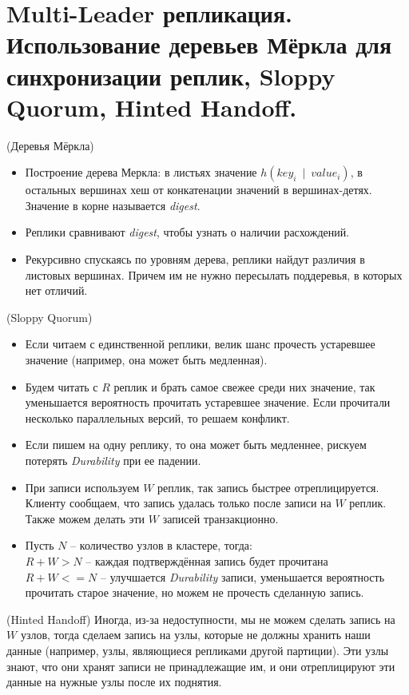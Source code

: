 \section{Multi-Leader репликация. Использование деревьев Мёркла для синхронизации реплик, Sloppy Quorum, Hinted Handoff.}

\begin{algorithm}(Деревья Мёркла)
\begin{itemize}
    \item Построение дерева Меркла: в листьях значение $h(key_i ~\mid~ value_i)$,
        в остальных вершинах хеш от конкатенации значений в вершинах-детях.
        Значение в корне называется \textit{digest}.
    \item Реплики сравнивают \textit{digest}, чтобы узнать о наличии расхождений.
    \item Рекурсивно спускаясь по уровням дерева, реплики найдут различия
        в листовых вершинах. Причем им не нужно пересылать поддеревья,
        в которых нет отличий.
\end{itemize}
\end{algorithm}

\begin{algorithm}(Sloppy Quorum)
  \begin{itemize}
    \item Если читаем с единственной реплики, велик шанс прочесть устаревшее значение
        (например, она может быть медленная).
    \item Будем читать с $R$ реплик и брать самое свежее среди них значение,
        так уменьшается вероятность прочитать устаревшее значение.
        Если прочитали несколько параллельных версий, то решаем конфликт.
    \item Если пишем на одну реплику, то она может быть медленнее,
        рискуем потерять \textit{Durability} при ее падении.
    \item При записи используем $W$ реплик, так запись быстрее отреплицируется.
        Клиенту сообщаем, что запись удалась только после записи на $W$ реплик.
        Также можем делать эти $W$ записей транзакционно.
    \item Пусть $N$ -- количество узлов в кластере, тогда: \\
        $R + W > N$ -- каждая подтверждённая запись будет прочитана \\
        $R + W <= N$ -- улучшается \textit{Durability} записи, уменьшается
        вероятность прочитать старое значение, но можем не прочесть сделанную запись.
  \end{itemize}
\end{algorithm}

\begin{algorithm}(Hinted Handoff)
    Иногда, из-за недоступности, мы не можем сделать запись на $W$ узлов,
    тогда сделаем запись на узлы, которые не должны хранить наши данные
    (например, узлы, являющиеся репликами другой партиции).
    Эти узлы знают, что они хранят записи не принадлежащие им,
    и они отреплицируют эти данные на нужные узлы после их поднятия.
\end{algorithm}
